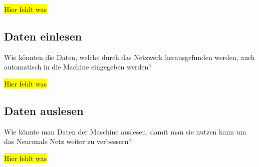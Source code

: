 \colorbox{yellow}{Hier fehlt was}

\subsection{Daten einlesen}
Wie könnten die Daten, welche durch das Netzwerk herausgefunden werden, auch automatisch in die Machine eingegeben werden?

\colorbox{yellow}{Hier fehlt was}

\subsection{Daten auslesen}
Wie könnte man Daten der Maschine auslesen, damit man sie nutzen kann um das Neuronale Netz weiter zu verbessern?

\colorbox{yellow}{Hier fehlt was}